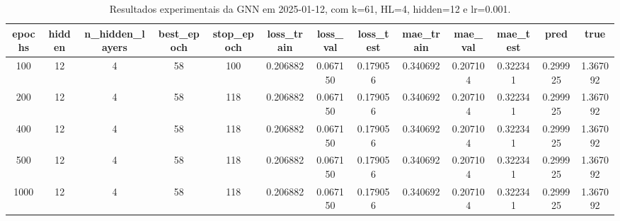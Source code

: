 \begin{table}[h]
\centering
\caption{Resultados experimentais da GNN em 2025-01-12, com k=61, HL=4, hidden=12 e lr=0.001.}
\label{tab:gnn_results_k61_hl4_h12_d20250112}
\begin{tabular}{ccccccccccccc}
\toprule
epochs & hidden & n\_hidden\_layers & best\_epoch & stop\_epoch & loss\_train & loss\_val & loss\_test & mae\_train & mae\_val & mae\_test & pred & true \\
\midrule
100 & 12 & 4 & 58 & 100 & 0.206882 & 0.067150 & 0.179056 & 0.340692 & 0.207104 & 0.322341 & 0.299925 & 1.367092 \\
200 & 12 & 4 & 58 & 118 & 0.206882 & 0.067150 & 0.179056 & 0.340692 & 0.207104 & 0.322341 & 0.299925 & 1.367092 \\
400 & 12 & 4 & 58 & 118 & 0.206882 & 0.067150 & 0.179056 & 0.340692 & 0.207104 & 0.322341 & 0.299925 & 1.367092 \\
500 & 12 & 4 & 58 & 118 & 0.206882 & 0.067150 & 0.179056 & 0.340692 & 0.207104 & 0.322341 & 0.299925 & 1.367092 \\
1000 & 12 & 4 & 58 & 118 & 0.206882 & 0.067150 & 0.179056 & 0.340692 & 0.207104 & 0.322341 & 0.299925 & 1.367092 \\
\bottomrule
\end{tabular}
\end{table}
